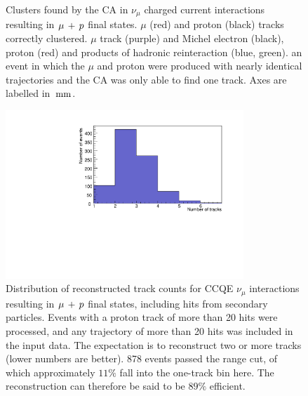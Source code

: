 \begin{figure}
{        \label{fig:ca-clusters-ccqe-1tr}
    }
    \caption[Clusters found by the CA in $\ccqe$ events]{\label{fig:ca-clusters-ccqe}Clusters found by the CA in $\nu_\mu$ charged current interactions resulting in $\ccqe$ final states.  $\mu$ (red) and proton (black) tracks correctly clustered.  $\mu$ track (purple) and Michel electron (black), proton (red) and products of hadronic reinteraction (blue, green).  an event in which the $\mu$ and proton were produced with nearly identical trajectories and the CA was only able to find one track. Axes are labelled in $\,\mathrm{mm}$.}
\end{figure}

\begin{figure}
    \centering
    \includegraphics[angle=-90,width=0.8\textwidth]{chapters/cellularautomaton_images/ccqe-trackcount}
    \caption[Number of reconstructed tracks in CCQE events]{\label{fig:ca-ccqe-full-trackcounts}Distribution of reconstructed track counts for CCQE $\nu_\mu$ interactions resulting in $\ccqe$ final states, including hits from secondary particles. Events with a proton track of more than 20 hits were processed, and any trajectory of more than 20 hits was included in the input data. The expectation is to reconstruct two or more tracks (lower numbers are better). 878 events passed the range cut, of which approximately $11\%$ fall into the one-track bin here. The reconstruction can therefore be said to be $89\%$ efficient.}
\end{figure}

